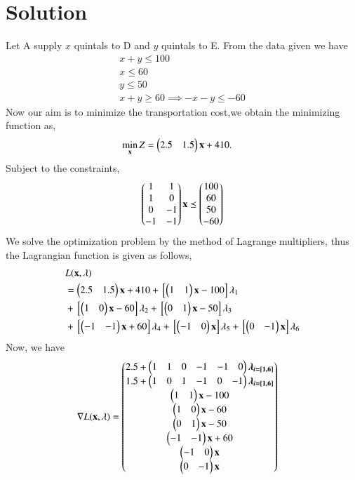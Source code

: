 \documentclass[journal,12pt,twocolumn]{IEEEtran}
\begin{document}
\section{Solution}
Let A supply $x$ quintals to D and $y$ quintals to E.
From the data given we have 
\begin{align}
    x+y\leq100 \\
    x\leq60 \\ 
    y\leq50 \\
    x+y\geq60 \implies -x-y\leq-60
\end{align}
Now our aim is to minimize the transportation cost,we obtain the minimizing function as,
\begin{align}
    \min_{\mathbf{x}} Z &= \begin{pmatrix}2.5 & 1.5\end{pmatrix}\mathbf{x}+410.
\end{align}
Subject to the constraints,
\begin{align}
    \begin{pmatrix}1 & 1 \\ 1 & 0 \\ 0 & -1 \\ -1 & -1\end{pmatrix}\mathbf{x} \preceq \begin{pmatrix}100 \\ 60 \\ 50 \\ -60\end{pmatrix}
\end{align}
We solve the optimization problem by the method of Lagrange multipliers, thus the Lagrangian function is given as follows,
\begin{equation}
  \begin{aligned}
     &L(\mathbf{x},\lambda) \\ &= \begin{pmatrix}2.5 & 1.5\end{pmatrix}\mathbf{x}+410+{}\left[\begin{pmatrix}1 & 1\end{pmatrix}\mathbf{x}-100\right]\lambda_1 \\ &+ {}\left[\begin{pmatrix}1 & 0\end{pmatrix}\mathbf{x}-60\right]\lambda_2 +{}\left[\begin{pmatrix}0 & 1\end{pmatrix}\mathbf{x}-50\right]\lambda_3 \\ &+ {}\left[\begin{pmatrix}-1 & -1\end{pmatrix}\mathbf{x}+60\right]\lambda_4 +{}\left[\begin{pmatrix}-1 & 0\end{pmatrix}\mathbf{x}\right]\lambda_5+{}\left[\begin{pmatrix}0 & -1\end{pmatrix}\mathbf{x}\right]\lambda_6
\end{aligned}  
\end{equation}
Now, we have 
\begin{align}
    \nabla L(\mathbf{x},\lambda) &= \begin{pmatrix}2.5+ \begin{pmatrix}1 & 1 & 0 & -1 & -1 & 0\end{pmatrix}\boldsymbol{\lambda_{i=[1,6]}}\\ 1.5+\begin{pmatrix}1 & 0 & 1 & -1 & 0 & -1\end{pmatrix}\boldsymbol{\lambda_{i=[1,6]}} \\ \begin{pmatrix}1 & 1\end{pmatrix}\mathbf{x}-100 \\ \begin{pmatrix}1 & 0\end{pmatrix}\mathbf{x}-60 \\ \begin{pmatrix}0 & 1\end{pmatrix}\mathbf{x}-50 \\ \begin{pmatrix}-1 & -1\end{pmatrix}\mathbf{x}+60 \\ \begin{pmatrix}-1 & 0\end{pmatrix}\mathbf{x} \\ \begin{pmatrix}0 & -1\end{pmatrix}\mathbf{x}\end{pmatrix}
\end{align}
\end{document}
